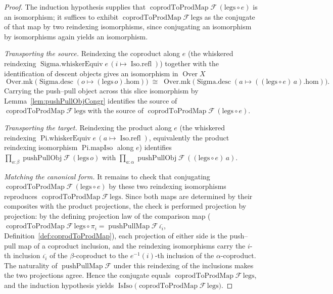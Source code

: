 \begin{proof}
  \leanok
  The induction hypothesis supplies that
  \(\operatorname{coprodToProdMap}\mathcal{F}\,(\mathrm{legs} \circ e)\) is an isomorphism; it suffices
  to exhibit \(\operatorname{coprodToProdMap}\mathcal{F}\,\mathrm{legs}\) as the conjugate of that map by
  two reindexing isomorphisms, since conjugating an isomorphism by isomorphisms again yields an
  isomorphism.

  \emph{Transporting the source.} Reindexing the coproduct along \(e\) (the whiskered reindexing
  \(\operatorname{Sigma.whiskerEquiv} e\,(i \mapsto \operatorname{Iso.refl})\)) together with the
  identification of descent objects gives an isomorphism in \(\operatorname{Over} X\)
  \[
    \operatorname{Over.mk}\bigl(\operatorname{Sigma.desc}(o \mapsto (\mathrm{legs}\,o).\mathrm{hom})\bigr)
      \;\cong\;
    \operatorname{Over.mk}\bigl(\operatorname{Sigma.desc}(a \mapsto ((\mathrm{legs} \circ e)\,a).
      \mathrm{hom})\bigr).
  \]
  Carrying the push--pull object across this slice isomorphism by
  Lemma~\ref{lem:pushPullObjCongr} identifies the source of
  \(\operatorname{coprodToProdMap}\mathcal{F}\,\mathrm{legs}\) with the source of
  \(\operatorname{coprodToProdMap}\mathcal{F}\,(\mathrm{legs} \circ e)\).

  \emph{Transporting the target.} Reindexing the product along \(e\) (the whiskered reindexing
  \(\operatorname{Pi.whiskerEquiv} e\,(a \mapsto \operatorname{Iso.refl})\), equivalently the
  product reindexing isomorphism \(\operatorname{Pi.mapIso}\) along \(e\)) identifies
  \(\prod_{o : \beta} \operatorname{pushPullObj}\mathcal{F}\,(\mathrm{legs}\,o)\) with
  \(\prod_{a : \alpha} \operatorname{pushPullObj}\mathcal{F}\,((\mathrm{legs} \circ e)\,a)\).

  \emph{Matching the canonical form.} It remains to check that conjugating
  \(\operatorname{coprodToProdMap}\mathcal{F}\,(\mathrm{legs} \circ e)\) by these two reindexing
  isomorphisms reproduces \(\operatorname{coprodToProdMap}\mathcal{F}\,\mathrm{legs}\). Since both maps
  are determined by their composites with the product projections, the check is performed projection by
  projection: by the defining projection law of the comparison map
  (\(\operatorname{coprodToProdMap}\mathcal{F}\,\mathrm{legs} \circ \pi_i =
  \operatorname{pushPullMap}\mathcal{F}\,\overline{\iota_i}\), Definition~\ref{def:coprodToProdMap}),
  each projection of either side is the push--pull map of a coproduct inclusion, and the reindexing
  isomorphisms carry the \(i\)-th inclusion \(\overline{\iota_i}\) of the \(\beta\)-coproduct to the
  \(e^{-1}(i)\)-th inclusion of the \(\alpha\)-coproduct. The naturality of
  \(\operatorname{pushPullMap}\mathcal{F}\) under this reindexing of the inclusions makes the two
  projections agree. Hence the conjugate equals
  \(\operatorname{coprodToProdMap}\mathcal{F}\,\mathrm{legs}\), and the induction hypothesis yields
  \(\operatorname{IsIso}\bigl(\operatorname{coprodToProdMap}\mathcal{F}\,\mathrm{legs}\bigr)\).
\end{proof}

